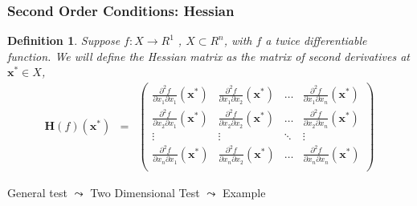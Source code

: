 \documentclass{beamer}
\newtheorem{defn}{Definition}
\numberwithin{equation}{section}
\begin{document}
\begin{frame}
\frametitle{Second Order Conditions: Hessian}


\begin{defn}
Suppose $f:X \rightarrow R^{1}$ , $X \subset R^{n}$, with $f$ a twice differentiable function.  We will define the Hessian matrix as the matrix of second derivatives at $\boldsymbol{x}^{*} \in X$,
\begin{eqnarray}
\boldsymbol{H}(f)(\boldsymbol{x}^{*} )  & = & \begin{pmatrix} 
		\frac{\partial^{2} f }{\partial x_{1} \partial x_{1} } (\boldsymbol{x}^{*} ) & \frac{\partial^{2} f }{\partial x_{1} \partial x_{2} } (\boldsymbol{x}^{*} ) & \hdots & \frac{\partial^{2} f }{\partial x_{1} \partial x_{n} } (\boldsymbol{x}^{*} ) \\
		\frac{\partial^{2} f }{\partial x_{2} \partial x_{1} } (\boldsymbol{x}^{*} ) & \frac{\partial^{2} f }{\partial x_{2} \partial x_{2} } (\boldsymbol{x}^{*} ) & \hdots & \frac{\partial^{2} f }{\partial x_{2} \partial x_{n} } (\boldsymbol{x}^{*} ) \\
		\vdots & \vdots & \ddots & \vdots \\
		\frac{\partial^{2} f }{\partial x_{n} \partial x_{1} } (\boldsymbol{x}^{*} ) & \frac{\partial^{2} f }{\partial x_{n} \partial x_{2} } (\boldsymbol{x}^{*} ) & \hdots & \frac{\partial^{2} f }{\partial x_{n} \partial x_{n} } (\boldsymbol{x}^{*} ) \\
\end{pmatrix} \nonumber 
\end{eqnarray}

\end{defn} \pause	
								
General test $\leadsto$ Two Dimensional Test $\leadsto$ Example

\end{frame}
\end{document}
